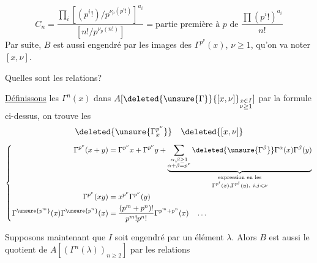 \[
C_n=\frac{\prod_i[(p^i!)/p^{\nu_p(p^i!)}]^{a_i}}{[n!/p^{\nu_p(n!)}]}=\text{partie première à }p\text{ de }\frac{\prod(p^i!)^{a_i}}{n!}
\]
Par suite, $B$ est aussi engendré par les images des $\Gamma^{p^\nu}(x)$, $\nu\geq1$, qu'on va noter $[x,\nu]$.

Quelles sont les relations?

\uline{Définissons} les $\Gamma^n(x)$ dans $A[\deleted{\unsure{\Gamma}}\{[x,\nu]\}_{\substack{x\in I\\\nu\geq1}}]$ par la formule ci-dessus,  on trouve les  
\[
\deleted{\unsure{\Gamma_x^{p^\nu}}}\quad\deleted{[x,\nu]}
\]
\[
\left\{\begin{aligned}
\Gamma^{p^\nu}(x+y)&=\Gamma^{p^\nu}x+\Gamma^{p^\nu}y+\underbrace{\sum_{\substack{\alpha,\beta\geq1\\\alpha+\beta=p^\nu}}\deleted{\unsure{\Gamma^\beta}}\Gamma^\alpha(x)\Gamma^\beta(y)}_{\substack{\text{expression en les}\\\Gamma^{p^i}(x),\Gamma^{p^j}(y),\ i,j<\nu}}\\
\Gamma^{p^\nu}(xy)&=x^{p^\nu}\Gamma^{p^\nu}(y)\\
\Gamma^{\unsure{p^m}}(x)\Gamma^{\unsure{p^n}}(x)&=\frac{(p^m+p^n)!}{p^m!p^n!}\Gamma^{p^m+p^n}(x)\quad\ldots
\end{aligned}\right.
\]


Supposons maintenant que $I$ soit engendré par un élément $\lambda$. Alors $B$ est aussi  le quotient de $A[(\Gamma^n(\lambda))_{n\geq2}]$ par les relations
